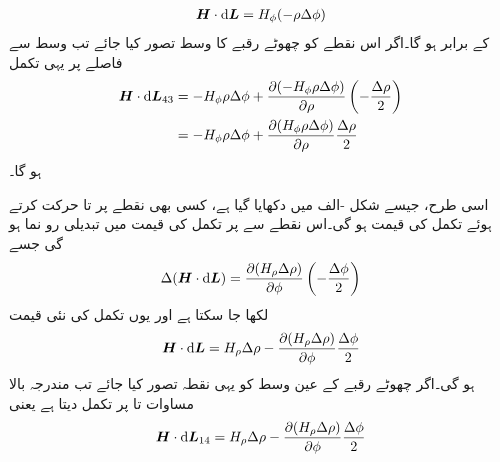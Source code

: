 \begin{align*}
\kvec{H} \cdot \dif \kvec{L}=H_{\phi} (-\rho \Delta \phi)
\end{align*}
کے برابر ہو گا۔اگر اس نقطے کو چھوٹے رقبے کا وسط تصور کیا جائے تب وسط سے   فاصلے پر یہی تکمل
\begin{gather}
\begin{aligned}\label{مساوات_مقناطیسی_نلکی_تین_چار}
\kvec{H} \cdot \dif \kvec{L}_{43}&=-H_{\phi}\rho \Delta \phi+\frac{\partial (-H_{\phi}\rho \Delta \phi)}{\partial \rho} \left(-\frac{\Delta \rho}{2}\right)\\
&=-H_{\phi}\rho \Delta \phi+\frac{\partial (H_{\phi}\rho \Delta \phi)}{\partial \rho} \frac{\Delta \rho}{2}
\end{aligned}
\end{gather}
ہو گا۔

اسی طرح، جیسے شکل -الف میں دکھایا گیا ہے، کسی بھی نقطے پر  تا  حرکت کرتے ہوئے تکمل کی قیمت  ہو گی۔اس نقطے سے  پر تکمل کی قیمت میں تبدیلی رو نما ہو گی جسے
\begin{align*}
\Delta  (\kvec{H} \cdot \dif \kvec{L})=\frac{\partial (H_{\rho} \Delta \rho)}{\partial \phi}\left(-\frac{\Delta \phi}{2}\right)
\end{align*}
لکھا جا سکتا ہے اور یوں تکمل کی نئی قیمت
\begin{align*}
\kvec{H} \cdot \dif \kvec{L}=H_{\rho} \Delta \rho-\frac{\partial (H_{\rho} \Delta \rho)}{\partial \phi}\frac{\Delta \phi}{2}
\end{align*}
ہو گی۔اگر چھوٹے رقبے کے عین وسط کو یہی نقطہ تصور کیا جائے تب مندرجہ بالا مساوات  تا  پر تکمل دیتا ہے یعنی
\begin{align}\label{مساوات_مقناطیسی_نلکی_چار_ایک}
\kvec{H} \cdot \dif \kvec{L}_{14}=H_{\rho} \Delta \rho-\frac{\partial (H_{\rho} \Delta \rho)}{\partial \phi}\frac{\Delta \phi}{2}
\end{align}

